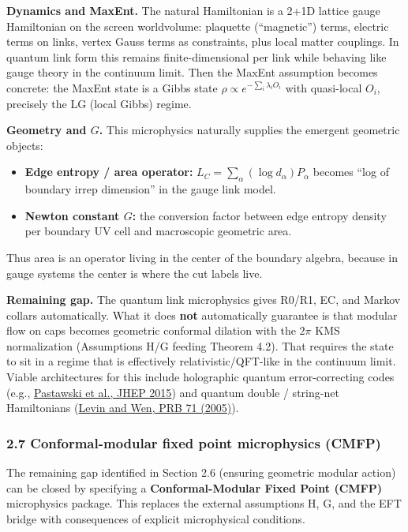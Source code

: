 \documentclass[11pt,a4paper]{article}
\theoremstyle{remark}
\providecommand{\tightlist}{%
  \setlength{\itemsep}{0pt}\setlength{\parskip}{0pt}}
\begin{document}
\textbf{Dynamics and MaxEnt.} The natural Hamiltonian is a 2+1D lattice gauge
Hamiltonian on the screen worldvolume: plaquette (``magnetic'') terms, electric
terms on links, vertex Gauss terms as constraints, plus local matter couplings.
In quantum link form this remains finite-dimensional per link while behaving
like gauge theory in the continuum limit. Then the MaxEnt assumption becomes
concrete: the MaxEnt state is a Gibbs state \(\rho \propto e^{-\sum_i \lambda_i O_i}\)
with quasi-local \(O_i\), precisely the LG (local Gibbs) regime.

\textbf{Geometry and \(G\).} This microphysics naturally supplies the emergent
geometric objects:

\begin{itemize}
\tightlist
\item
  \textbf{Edge entropy / area operator:} \(L_C = \sum_\alpha (\log d_\alpha) P_\alpha\)
  becomes ``log of boundary irrep dimension'' in the gauge link model.
\item
  \textbf{Newton constant \(G\):} the conversion factor between edge entropy density
  per boundary UV cell and macroscopic geometric area.
\end{itemize}

Thus area is an operator living in the center of the boundary algebra, because
in gauge systems the center is where the cut labels live.

\textbf{Remaining gap.} The quantum link microphysics gives R0/R1, EC, and Markov
collars automatically. What it does \textbf{not} automatically guarantee is that
modular flow on caps becomes geometric conformal dilation with the \(2\pi\) KMS
normalization (Assumptions H/G feeding Theorem 4.2). That requires the state to
sit in a regime that is effectively relativistic/QFT-like in the continuum
limit. Viable architectures for this include holographic quantum error-correcting
codes (e.g., \href{https://arxiv.org/abs/1503.06237}{Pastawski et al., JHEP 2015})
and quantum double / string-net Hamiltonians
(\href{https://link.aps.org/doi/10.1103/PhysRevB.71.045110}{Levin and Wen, PRB 71 (2005)}).

\subsubsection{2.7 Conformal-modular fixed point microphysics (CMFP)}\label{conformal-modular-fixed-point-microphysics-cmfp}

The remaining gap identified in Section 2.6 (ensuring geometric modular action) can
be closed by specifying a \textbf{Conformal-Modular Fixed Point (CMFP)} microphysics
package. This replaces the external assumptions H, G, and the EFT bridge with
consequences of explicit microphysical conditions.
\end{document}
